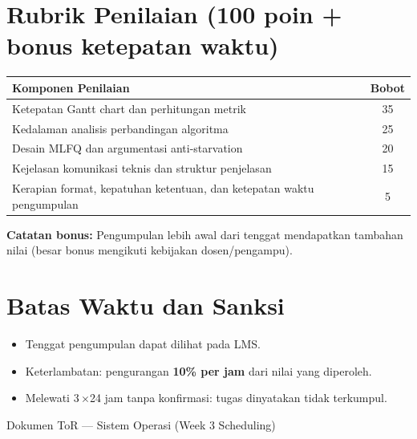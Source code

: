 \documentclass[12pt,a4paper]{article}
\begin{document}
\section{Rubrik Penilaian (100 poin + bonus ketepatan waktu)}
\begin{center}
\begin{tabular}{|p{8.5cm}|c|}
\hline
\textbf{Komponen Penilaian} & \textbf{Bobot} \\
\hline
Ketepatan Gantt chart dan perhitungan metrik & 35 \\
\hline
Kedalaman analisis perbandingan algoritma & 25 \\
\hline
Desain MLFQ dan argumentasi anti-starvation & 20 \\
\hline
Kejelasan komunikasi teknis dan struktur penjelasan & 15 \\
\hline
Kerapian format, kepatuhan ketentuan, dan ketepatan waktu pengumpulan & 5 \\
\hline
\end{tabular}
\end{center}
\noindent
\textbf{Catatan bonus:} Pengumpulan lebih awal dari tenggat mendapatkan tambahan nilai (besar bonus mengikuti kebijakan dosen/pengampu).

\section{Batas Waktu dan Sanksi}
\begin{itemize}
    \item Tenggat pengumpulan dapat dilihat pada LMS.
    \item Keterlambatan: pengurangan \textbf{10\% per jam} dari nilai yang diperoleh.
    \item Melewati 3\,$\times$24 jam tanpa konfirmasi: tugas dinyatakan tidak terkumpul.
\end{itemize}

\vfill
\begin{flushright}
Dokumen ToR --- Sistem Operasi (Week 3 Scheduling)
\end{flushright}
\end{document}
